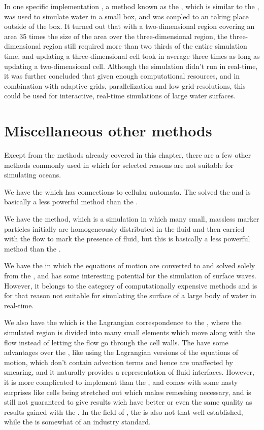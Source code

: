 In one specific implementation \citep{Thurey2006}, a method known as the , which is similar to the \FVM, was used to simulate water in a small box, and was coupled to an \SWS taking place outside of the box. It turned out that with a two-dimensional region covering an area 35 times the size of the area over the three-dimensional region, the three-dimensional region still required more than two thirds of the entire simulation time, and updating a three-dimensional cell took in average three times as long as updating a two-dimensional cell. Although the simulation didn't run in real-time, it was further concluded that given enough computational resources, and in combination with adaptive grids, parallelization and low grid-resolutions, this could be used for interactive, real-time simulations of large water surfaces.

\section{Miscellaneous other methods}

Except from the methods already covered in this chapter, there are a few other methods commonly used in \CFD which for selected reasons are not suitable for simulating oceans.

We have the \LBM which has connections to cellular automata. The \LBM solved the  and is basically a less powerful \CFD method than the \FVM.

We have the \MAC method, which is a \FVM simulation in which many small, massless marker particles initially are homogeneously distributed in the fluid and then carried with the flow to mark the presence of fluid, but this is basically a less powerful method than the .

We have the \BEM in which the equations of motion are converted to  and solved solely from the \boundaries, and has some interesting potential for the simulation of surface waves. However, it belongs to the category of computationally expensive methods and is for that reason not suitable for simulating the surface of a large body of water in real-time.

We also have the \FEM which is the Lagrangian correspondence to the \FVM, where the simulated region is divided into many small elements which move along with the flow instead of letting the flow go through the cell walls. The \FEM have some advantages over the \FVM, like using the Lagrangian versions of the equations of motion, which don't contain advection terms and hence are unaffected by smearing, and it naturally provides a representation of fluid interfaces. However, it is more complicated to implement than the \FVM, and comes with some nasty surprises like cells being stretched out which makes remeshing necessary, and is still not guaranteed to give results wich have better or even the same quality as results gained with the \FVM. In the field of \CFD, the \FEM is also not that well established, while the \FVM is somewhat of an industry standard.